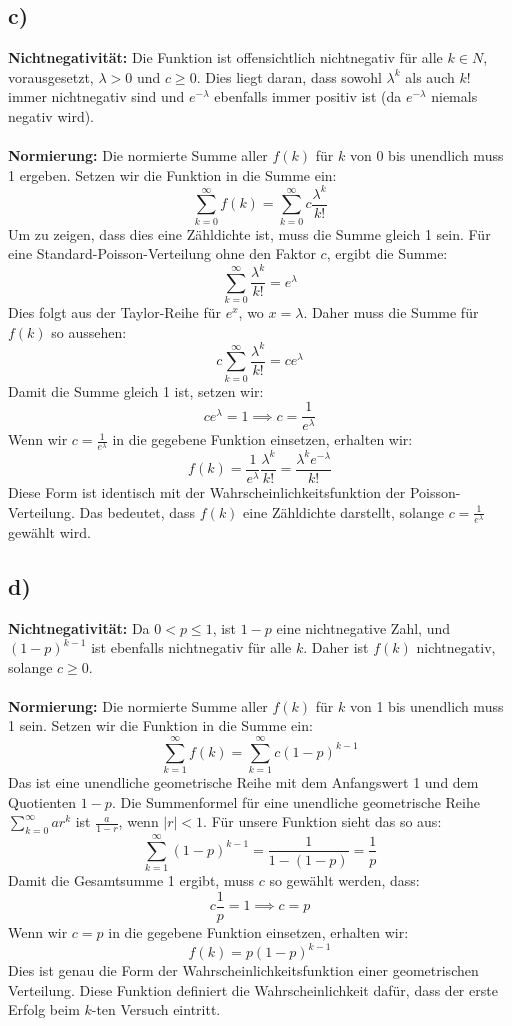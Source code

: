 \documentclass[a4paper]{scrartcl}
\begin{document}
\subsection*{c)}
\textbf{Nichtnegativität:} Die Funktion ist offensichtlich nichtnegativ für alle \( k \in N \), vorausgesetzt, \( \lambda > 0 \) und \( c \geq 0 \). Dies liegt daran, dass sowohl \(\lambda^k\) als auch \(k!\) immer nichtnegativ sind und \( e^{-\lambda} \) ebenfalls immer positiv ist (da \(e^{-\lambda}\) niemals negativ wird).
\\\\
\textbf{Normierung:} Die normierte Summe aller \( f(k) \) für \( k \) von 0 bis unendlich muss 1 ergeben. Setzen wir die Funktion in die Summe ein:
\[
\sum_{k=0}^\infty f(k) = \sum_{k=0}^\infty c \frac{\lambda^k}{k!} 
\]
Um zu zeigen, dass dies eine Zähldichte ist, muss die Summe gleich 1 sein. Für eine Standard-Poisson-Verteilung ohne den Faktor \( c \), ergibt die Summe:
\[
\sum_{k=0}^\infty \frac{\lambda^k}{k!} = e^{\lambda}
\]
Dies folgt aus der Taylor-Reihe für \( e^x \), wo \( x = \lambda \). Daher muss die Summe für \( f(k) \) so aussehen:
\[
c \sum_{k=0}^\infty \frac{\lambda^k}{k!} = c e^{\lambda}
\]
Damit die Summe gleich 1 ist, setzen wir:
\[
c e^{\lambda} = 1 \implies c = \frac{1}{e^{\lambda}}
\]
Wenn wir \( c = \frac{1}{e^{\lambda}} \) in die gegebene Funktion einsetzen, erhalten wir:
\[
f(k) = \frac{1}{e^{\lambda}} \frac{\lambda^k}{k!} = \frac{\lambda^k e^{-\lambda}}{k!}
\]
Diese Form ist identisch mit der Wahrscheinlichkeitsfunktion der Poisson-Verteilung. Das bedeutet, dass \( f(k) \) eine Zähldichte darstellt, solange \( c = \frac{1}{e^{\lambda}} \) gewählt wird.

\subsection*{d)}
\textbf{Nichtnegativität: } Da \( 0 < p \leq 1 \), ist \( 1-p \) eine nichtnegative Zahl, und \( (1-p)^{k-1} \) ist ebenfalls nichtnegativ für alle \( k \). Daher ist \( f(k) \) nichtnegativ, solange \( c \geq 0 \).
\\\\
\textbf{Normierung:} Die normierte Summe aller \( f(k) \) für \( k \) von 1 bis unendlich muss 1 sein. Setzen wir die Funktion in die Summe ein:
\[
\sum_{k=1}^\infty f(k) = \sum_{k=1}^\infty c(1-p)^{k-1}
\]
Das ist eine unendliche geometrische Reihe mit dem Anfangswert 1 und dem Quotienten \( 1-p \). Die Summenformel für eine unendliche geometrische Reihe \( \sum_{k=0}^\infty ar^k \) ist \( \frac{a}{1-r} \), wenn \( |r| < 1 \). Für unsere Funktion sieht das so aus:
\[
\sum_{k=1}^\infty (1-p)^{k-1} = \frac{1}{1-(1-p)} = \frac{1}{p}
\]
Damit die Gesamtsumme 1 ergibt, muss \( c \) so gewählt werden, dass:
\[
c \frac{1}{p} = 1 \implies c = p
\]
Wenn wir \( c = p \) in die gegebene Funktion einsetzen, erhalten wir:
\[
f(k) = p(1-p)^{k-1}
\]
Dies ist genau die Form der Wahrscheinlichkeitsfunktion einer geometrischen Verteilung. Diese Funktion definiert die Wahrscheinlichkeit dafür, dass der erste Erfolg beim \( k \)-ten Versuch eintritt.
\end{document}
